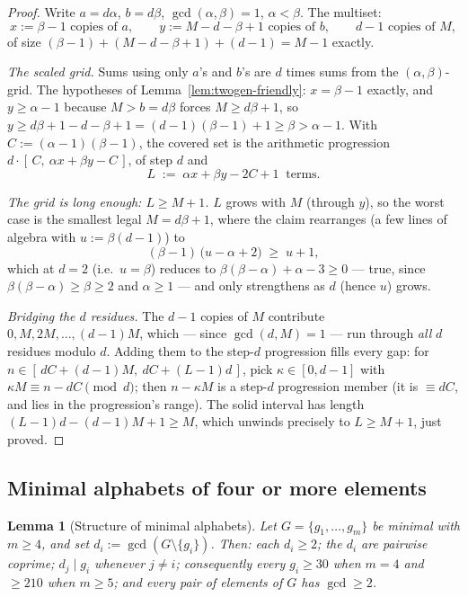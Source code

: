 \documentclass[11pt,reqno]{amsart}
\theoremstyle{plain}
\newtheorem{lemma}[theorem]{Lemma}
\theoremstyle{definition}
\theoremstyle{remark}
\begin{document}
\begin{proof}
Write $a = d\alpha$, $b = d\beta$, $\gcd(\alpha, \beta) = 1$, $\alpha < \beta$.
The multiset:
\[
  x := \beta - 1 \text{ copies of } a, \qquad
  y := M - d - \beta + 1 \text{ copies of } b, \qquad
  d - 1 \text{ copies of } M ,
\]
of size $(\beta - 1) + (M - d - \beta + 1) + (d-1) = M - 1$ exactly.

\emph{The scaled grid.} Sums using only $a$'s and $b$'s are $d$ times sums from
the $(\alpha, \beta)$-grid. The hypotheses of Lemma~\ref{lem:twogen-friendly}:
$x = \beta - 1$ exactly, and $y \ge \alpha - 1$ because $M > b = d\beta$ forces
$M \ge d\beta + 1$, so $y \ge d\beta + 1 - d - \beta + 1 = (d-1)(\beta-1) + 1 \ge
\beta > \alpha - 1$. With $C := (\alpha-1)(\beta-1)$, the covered set is the
arithmetic progression $d \cdot [\,C,\ \alpha x + \beta y - C\,]$, of step $d$ and
\[
  L \;:=\; \alpha x + \beta y - 2C + 1 \ \text{ terms}.
\]

\emph{The grid is long enough: $L \ge M + 1$.} $L$ grows with $M$ (through $y$),
so the worst case is the smallest legal $M = d\beta + 1$, where the claim
rearranges (a few lines of algebra with $u := \beta(d-1)$) to
\[
  (\beta - 1)\,\big( u - \alpha + 2 \big) \;\ge\; u + 1 ,
\]
which at $d = 2$ (i.e.\ $u = \beta$) reduces to $\beta(\beta - \alpha) + \alpha -
3 \ge 0$ --- true, since $\beta(\beta-\alpha) \ge \beta \ge 2$ and $\alpha \ge 1$
--- and only strengthens as $d$ (hence $u$) grows.

\emph{Bridging the $d$ residues.} The $d - 1$ copies of $M$ contribute $0, M,
2M, \dots, (d-1)M$, which --- since $\gcd(d, M) = 1$ --- run through \emph{all} $d$
residues modulo $d$. Adding them to the step-$d$ progression fills every gap: for
$n \in [\,dC + (d-1)M,\ dC + (L-1)d\,]$, pick $\kappa \in [0, d-1]$ with $\kappa M
\equiv n - dC \pmod d$; then $n - \kappa M$ is a step-$d$ progression member (it
is $\equiv dC$, and lies in the progression's range). The solid interval has
length $(L-1)d - (d-1)M + 1 \ge M$, which unwinds precisely to $L \ge M+1$, just
proved.
\end{proof}

\subsection{Minimal alphabets of four or more elements}

\begin{lemma}[Structure of minimal alphabets]\label{lem:minimal-friendly}
Let $G = \{g_1, \dots, g_m\}$ be minimal with $m \ge 4$, and set $d_i :=
\gcd(G \setminus \{g_i\})$. Then: each $d_i \ge 2$; the $d_i$ are pairwise
coprime; $d_j \mid g_i$ whenever $j \ne i$; consequently every $g_i \ge 30$ when
$m = 4$ and $\ge 210$ when $m \ge 5$; and every pair of elements of $G$ has
$\gcd \ge 2$.
\end{lemma}
\end{document}
